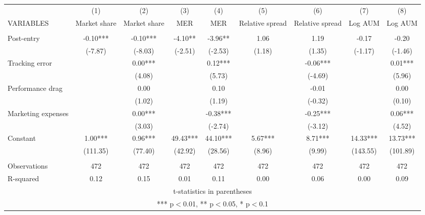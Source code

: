 \documentclass[]{article}
\begin{document}
\begin{tabular}{lcccccccc} \hline
 & (1) & (2) & (3) & (4) & (5) & (6) & (7) & (8) \\
VARIABLES & Market share & Market share & MER & MER & Relative spread & Relative spread & Log AUM & Log AUM \\ \hline
 &  &  &  &  &  &  &  &  \\
Post-entry & -0.10*** & -0.10*** & -4.10** & -3.96** & 1.06 & 1.19 & -0.17 & -0.20 \\
 & (-7.87) & (-8.03) & (-2.51) & (-2.53) & (1.18) & (1.35) & (-1.17) & (-1.46) \\
Tracking error &  & 0.00*** &  & 0.12*** &  & -0.06*** &  & 0.01*** \\
 &  & (4.08) &  & (5.73) &  & (-4.69) &  & (5.96) \\
Performance drag &  & 0.00 &  & 0.10 &  & -0.01 &  & 0.00 \\
 &  & (1.02) &  & (1.19) &  & (-0.32) &  & (0.10) \\
Marketing expenses &  & 0.00*** &  & -0.38*** &  & -0.25*** &  & 0.06*** \\
 &  & (3.03) &  & (-2.74) &  & (-3.12) &  & (4.52) \\
Constant & 1.00*** & 0.96*** & 49.43*** & 44.10*** & 5.67*** & 8.71*** & 14.33*** & 13.73*** \\
 & (111.35) & (77.40) & (42.92) & (28.56) & (8.96) & (9.99) & (143.55) & (101.89) \\
 &  &  &  &  &  &  &  &  \\
Observations & 472 & 472 & 472 & 472 & 472 & 472 & 472 & 472 \\
 R-squared & 0.12 & 0.15 & 0.01 & 0.11 & 0.00 & 0.06 & 0.00 & 0.09 \\ \hline
\multicolumn{9}{c}{ t-statistics in parentheses} \\
\multicolumn{9}{c}{ *** p$<$0.01, ** p$<$0.05, * p$<$0.1} \\
\end{tabular}
\end{document}
